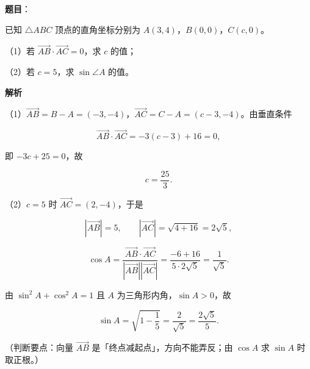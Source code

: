 \begin{answer}

\textbf{题目}：

已知 $\triangle ABC$ 顶点的直角坐标分别为 $A(3,4)$，$B(0,0)$，$C(c,0)$。

（1）若 $\overrightarrow{AB}\cdot\overrightarrow{AC}=0$，求 $c$ 的值；

（2）若 $c=5$，求 $\sin\angle A$ 的值。

\textbf{解析}

（1）$\overrightarrow{AB}=B-A=(-3,-4)$，$\overrightarrow{AC}=C-A=(c-3,-4)$。由垂直条件

\nopagebreak[4]
\[\overrightarrow{AB}\cdot\overrightarrow{AC}=-3(c-3)+16=0,\]

即 $-3c+25=0$，故

\nopagebreak[4]
\[c=\frac{25}{3}.\]

（2）$c=5$ 时 $\overrightarrow{AC}=(2,-4)$，于是

\nopagebreak[4]
\[|\overrightarrow{AB}|=5,\qquad |\overrightarrow{AC}|=\sqrt{4+16}=2\sqrt5,\]

\nopagebreak[4]
\[\cos A=\frac{\overrightarrow{AB}\cdot\overrightarrow{AC}}{|\overrightarrow{AB}||\overrightarrow{AC}|}=\frac{-6+16}{5\cdot2\sqrt5}=\frac{1}{\sqrt5}.\]

由 $\sin^2A+\cos^2A=1$ 且 $A$ 为三角形内角，$\sin A>0$，故

\nopagebreak[4]
\[\sin A=\sqrt{1-\frac15}=\frac{2}{\sqrt5}=\frac{2\sqrt5}{5}.\]

（判断要点：向量 $\overrightarrow{AB}$ 是「终点减起点」，方向不能弄反；由 $\cos A$ 求 $\sin A$ 时取正根。）


\end{answer}
